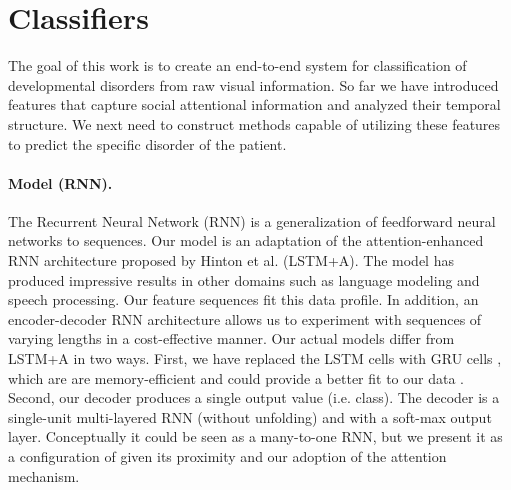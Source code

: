 \documentclass{llncs}
\begin{document}


  \vspace*{-\baselineskip}
  \section{Classifiers}
  \vspace*{-\baselineskip}

  \label{sec:classification}
  The goal of this work is to create an end-to-end system for classification of developmental disorders from raw visual information. So far we have introduced features that capture social attentional information and analyzed their temporal structure. We next need to construct methods capable of utilizing these features to predict the specific disorder of the patient.
  \vspace*{-\baselineskip}
  \paragraph{Model (RNN).} The Recurrent Neural Network (RNN) is a generalization of feedforward neural networks to sequences. Our model is an adaptation of the attention-enhanced RNN architecture proposed by Hinton et al. \cite{NIPS2015_5635} (LSTM+A). The model has produced impressive results in other domains such as language modeling and speech processing. Our feature sequences fit this data profile. In addition, an encoder-decoder RNN architecture allows us to experiment with sequences of varying lengths in a cost-effective manner. Our actual models differ from LSTM+A in two ways. First, we have replaced the LSTM cells with GRU cells \cite{Cho}, which are are memory-efficient and could provide a better fit to our data \cite{JozefowiczZS15}. Second, our decoder produces a single output value (i.e. class). The decoder is a single-unit multi-layered RNN (without unfolding) and with a soft-max output layer. Conceptually it could be seen as a many-to-one RNN, but we present it as a configuration of \cite{NIPS2015_5635} given its proximity and our adoption of the attention mechanism.
\end{document}
